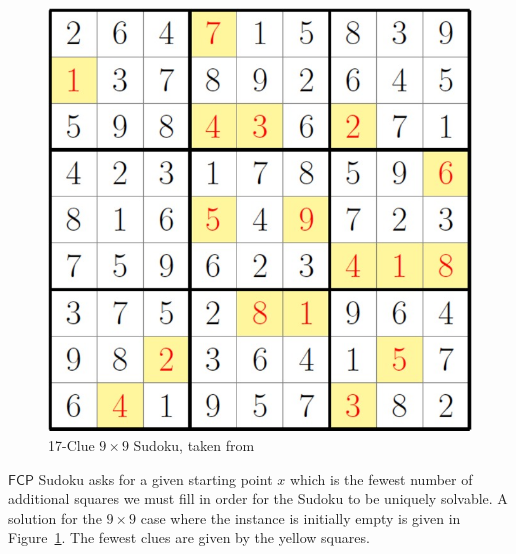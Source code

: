 \documentclass[runningheads,a4paper]{llncs}
\begin{document}
\begin{figure}
\centering
\label{fig:seventeencluesudoku}
\includegraphics[width=0.5\linewidth]{seventeencluesudoku.jpg}
\caption{17-Clue $9 \times 9$ Sudoku, taken from \cite{smallsudoku}}
\end{figure}

$\mathsf{FCP}$ Sudoku asks for a given starting point $x$ which is the fewest number of additional squares we must fill in order for the Sudoku to be uniquely solvable. A solution for the $9 \times 9$ case where the instance is initially empty is given in Figure~\ref{fig:seventeencluesudoku}. The fewest clues are given by the yellow squares.

%
%
%
%
\end{document}

